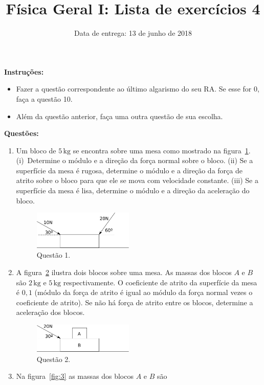 \documentclass[11pt,a4paper,twocolumn]{article}
\title{Física Geral I: Lista de exercícios 4}
\author{Data de entrega: 13 de junho de 2018}
\date{}
\newcommand{\un}[1]{\mathrm{#1}}
\begin{document}
\maketitle
\textbf{Instruções:}
\begin{itemize}
\item Fazer a questão correspondente ao último algarismo do seu RA. Se
  esse for $0$, faça a questão 10.
\item Além da questão anterior, faça uma outra questão de sua escolha.
\end{itemize}

\textbf{Questões:}
\begin{enumerate}
\item Um bloco de $5\,\un{kg}$ se encontra sobre uma mesa como
  mostrado na figura~\ref{fig:1}. (i)~Determine o módulo e a direção
  da força normal sobre o bloco. (ii) Se a superfície da mesa é
  rugosa, determine o módulo e a direção da força de atrito sobre o
  bloco para que ele se mova com velocidade constante. (iii) Se a
  superfície da mesa é lisa, determine o módulo e a direção da
  aceleração do bloco.
  \begin{figure}[ht]
    \centering
    \includegraphics[width=0.45\textwidth,keepaspectratio]{lista4-questao1.pdf}
    \caption{Questão 1.}
    \label{fig:1}
  \end{figure}
\item A figura~\ref{fig:2} ilustra dois blocos sobre uma mesa. As
  massas dos blocos $A$ e $B$ são $2\,\un{kg}$ e $5\,\un{kg}$
  respectivamente. O coeficiente de atrito da superfície da mesa é
  $0{,}1$ (módulo da força de atrito é igual ao módulo da força normal
  vezes o coeficiente de atrito). Se não há força de atrito entre os
  blocos, determine a aceleração dos blocos.
  \begin{figure}[ht]
    \centering
    \includegraphics[width=0.45\textwidth,keepaspectratio]{lista4-questao2.pdf}
    \caption{Questão 2.}
    \label{fig:2}
  \end{figure}
\item Na figura~\ref{fig:3} as massas dos blocos $A$ e $B$ são

\end{enumerate}
\end{document}
